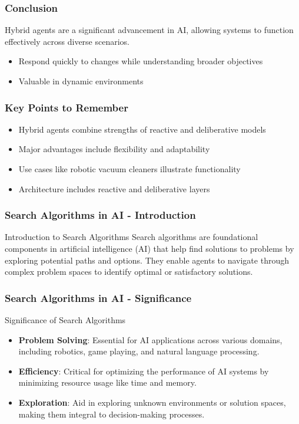 \documentclass[aspectratio=169]{beamer}
\begin{document}
\begin{frame}[fragile]
    \frametitle{Conclusion}
    Hybrid agents are a significant advancement in AI, allowing systems to function effectively across diverse scenarios.
    \begin{itemize}
        \item Respond quickly to changes while understanding broader objectives
        \item Valuable in dynamic environments
    \end{itemize}
\end{frame}

\begin{frame}[fragile]
    \frametitle{Key Points to Remember}
    \begin{itemize}
        \item Hybrid agents combine strengths of reactive and deliberative models
        \item Major advantages include flexibility and adaptability
        \item Use cases like robotic vacuum cleaners illustrate functionality
        \item Architecture includes reactive and deliberative layers
    \end{itemize}
\end{frame}

\begin{frame}[fragile]
    \frametitle{Search Algorithms in AI - Introduction}
    \begin{block}{Introduction to Search Algorithms}
        Search algorithms are foundational components in artificial intelligence (AI) that help find solutions to problems by exploring potential paths and options. 
        They enable agents to navigate through complex problem spaces to identify optimal or satisfactory solutions.
    \end{block}
\end{frame}

\begin{frame}[fragile]
    \frametitle{Search Algorithms in AI - Significance}
    \begin{block}{Significance of Search Algorithms}
        \begin{itemize}
            \item \textbf{Problem Solving}: Essential for AI applications across various domains, including robotics, game playing, and natural language processing.
            \item \textbf{Efficiency}: Critical for optimizing the performance of AI systems by minimizing resource usage like time and memory.
            \item \textbf{Exploration}: Aid in exploring unknown environments or solution spaces, making them integral to decision-making processes.
        \end{itemize}
    \end{block}
\end{frame}
\end{document}
